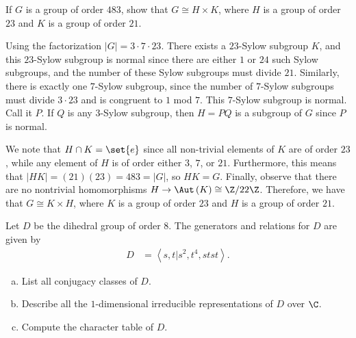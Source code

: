 \documentclass[10pt]{mypackage}
\begin{document}
\begin{problem}[Problem 5]
  If $G$ is a group of order $483$, show that $G\cong H\times K$, where $H$ is a group of order $23$ and $K$ is a group of order $21$.
\end{problem}
\begin{solution}
  Using the factorization $\left\vert G \right\vert = 3\cdot 7 \cdot 23$. There exists a $23$-Sylow subgroup $K$, and this $23$-Sylow subgroup is normal since there are either $1$ or $24$ such Sylow subgroups, and the number of these Sylow subgroups must divide $21$. Similarly, there is exactly one $7$-Sylow subgroup, since the number of $7$-Sylow subgroups must divide $3\cdot 23$ and is congruent to $1$ mod $7$. This $7$-Sylow subgroup is normal. Call it $P$. If $Q$ is any $3$-Sylow subgroup, then $H = PQ$ is a subgroup of $G$ since $P$ is normal.

  We note that $H\cap K = \set{e}$ since all non-trivial elements of $K$ are of order $23$, while any element of $H$ is of order either $3$, $7$, or $21$. Furthermore, this means that $\left\vert HK \right\vert = (21)(23) = 483 = \left\vert G \right\vert$, so $HK = G$. Finally, observe that there are no nontrivial homomorphisms $H\rightarrow \Aut\left( K \right)\cong \Z/22\Z$. Therefore, we have that $G\cong K\times H$, where $K$ is a group of order $23$ and $H$ is a group of order $21$.
\end{solution}
\begin{problem}[Problem 6]
  Let $D$ be the dihedral group of order $8$. The generators and relations for $D$ are given by
  \begin{align*}
    D &= \left\langle s,t | s^2,t^4,stst \right\rangle.
  \end{align*}
  \begin{enumerate}[(a)]
    \item List all conjugacy classes of $D$.
    \item Describe all the $1$-dimensional irreducible representations of $D$ over $\C$.
    \item Compute the character table of $D$.
  \end{enumerate}
\end{problem}
\end{document}
